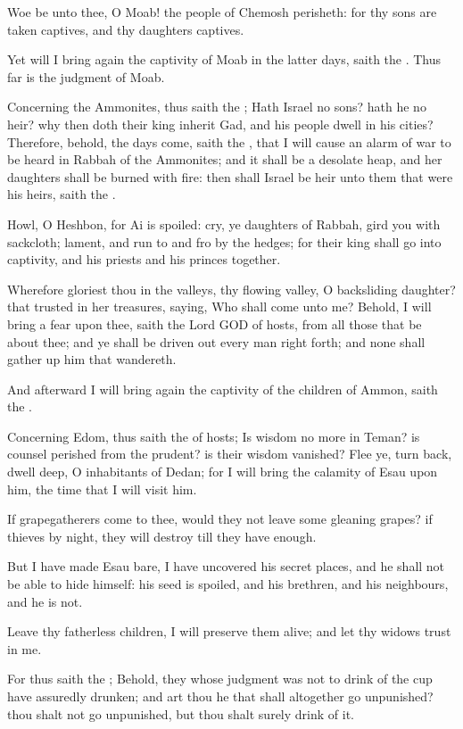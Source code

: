 \Verse Woe be unto thee, O Moab! the people of Chemosh perisheth: for thy sons are taken captives, and thy daughters captives.

\Verse Yet will I bring again the captivity of Moab in the latter days, saith the \LORD. Thus far is the judgment of Moab.


\Chapter
\Verse Concerning the Ammonites, thus saith the \LORD; Hath Israel no sons?  hath he no heir? why then doth their king inherit Gad, and his people dwell in his cities?  \Verse Therefore, behold, the days come, saith the \LORD, that I will cause an alarm of war to be heard in Rabbah of the Ammonites; and it shall be a desolate heap, and her daughters shall be burned with fire: then shall Israel be heir unto them that were his heirs, saith the \LORD.

\Verse Howl, O Heshbon, for Ai is spoiled: cry, ye daughters of Rabbah, gird you with sackcloth; lament, and run to and fro by the hedges; for their king shall go into captivity, and his priests and his princes together.

\Verse Wherefore gloriest thou in the valleys, thy flowing valley, O backsliding daughter? that trusted in her treasures, saying, Who shall come unto me?  \Verse Behold, I will bring a fear upon thee, saith the Lord GOD of hosts, from all those that be about thee; and ye shall be driven out every man right forth; and none shall gather up him that wandereth.

\Verse And afterward I will bring again the captivity of the children of Ammon, saith the \LORD.

\Verse Concerning Edom, thus saith the \LORD of hosts; Is wisdom no more in Teman? is counsel perished from the prudent? is their wisdom vanished?  \Verse Flee ye, turn back, dwell deep, O inhabitants of Dedan; for I will bring the calamity of Esau upon him, the time that I will visit him.

\Verse If grapegatherers come to thee, would they not leave some gleaning grapes? if thieves by night, they will destroy till they have enough.

\Verse But I have made Esau bare, I have uncovered his secret places, and he shall not be able to hide himself: his seed is spoiled, and his brethren, and his neighbours, and he is not.

\Verse Leave thy fatherless children, I will preserve them alive; and let thy widows trust in me.

\Verse For thus saith the \LORD; Behold, they whose judgment was not to drink of the cup have assuredly drunken; and art thou he that shall altogether go unpunished? thou shalt not go unpunished, but thou shalt surely drink of it.

